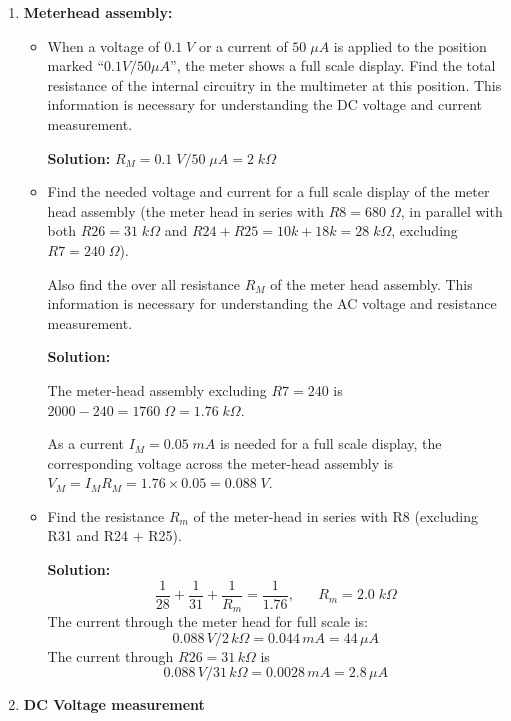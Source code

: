


\begin{enumerate}
\item {\bf Meterhead assembly:}

  \begin{itemize}

  \item 
    When a voltage of $0.1\;V$ or a current of $50\;\mu A$ is applied to 
    the position marked ``$0.1V/50\mu A$'', the meter shows a full scale display.
    Find the total resistance of the internal circuitry in the multimeter at this
    position. This information is necessary for understanding the DC voltage and
    current measurement.

    {\bf Solution:} $R_M=0.1\;V/50\;\mu A=2\;k\Omega$

  \item 
    Find the needed voltage and current for a full scale display of the meter
    head assembly (the meter head in series with $R8=680\;\Omega$, in parallel 
    with both $R26=31\;k\Omega$ and $R24+R25=10k+18k=28\;k\Omega$, excluding
    $R7=240\;\Omega$). 

    Also find the over all resistance $R_M$ of the meter head assembly. This 
    information is necessary for understanding the AC voltage and resistance 
    measurement.

    {\bf Solution:} 

    The meter-head assembly excluding $R7=240$ is $2000-240=1760\;\Omega=1.76\;k\Omega$.

    As a current $I_M=0.05\;mA$ is needed for a full scale display, the 
    corresponding voltage across the meter-head assembly is 
    $V_M=I_M R_M=1.76\times 0.05=0.088\;V$. 

  \item 
    Find the resistance $R_m$ of the meter-head in series with R8 (excluding R31 
    and R24 + R25).

    {\bf Solution:}
    \[
    \frac{1}{28}+\frac{1}{31}+\frac{1}{R_m}=\frac{1}{1.76},
    \;\;\;\;\;\;  R_m=2.0\;k\Omega
    \]
    The current through the meter head for full scale is:
    \[
    0.088\,V/2\,k\Omega=0.044\,mA=44\,\mu A
    \]
    The current through $R26=31\,k\Omega$ is
    \[
    0.088\,V/31\,k\Omega=0.0028\,mA=2.8\,\mu A
    \]

  \end{itemize}

\item {\bf DC Voltage measurement}
  

\end{enumerate}
